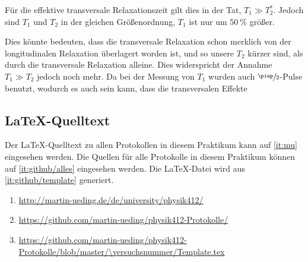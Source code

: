 Für die effektive transversale Relaxationszeit gilt dies in der Tat, $T_1 \gg
T_2^*$. Jedoch sind $T_1$ und $T_2$ in der gleichen Größenordnung, $T_1$ ist
nur um $\SI{50}{\percent}$ größer.

Dies könnte bedeuten, dass die transversale Relaxation schon merklich von der
longitudinalen Relaxation überlagert worden ist, und so unsere $T_2$ kürzer
sind, als durch die transversale Relaxation alleine. Dies widerspricht der
Annahme $T_1 \gg T_2$ jedoch noch mehr. Da bei der Messung von $T_1$ wurden
auch $\sfrac\piup2$-Pulse benutzt, wodurch es auch sein kann, dass die
transversalen Effekte 


\FloatBarrier
\begin{appendix}
    \FloatBarrier
    \chapter{\LaTeX-Quelltext}

    Der \LaTeX-Quelltext zu allen Protokollen in diesem Praktikum kann auf
    \ref{it:mu} eingesehen werden. Die Quellen für alle Protokolle in diesem
    Praktikum können auf \ref{it:github/alles} eingesehen werden. Die
    \LaTeX-Datei wird aus \ref{it:github/template} generiert.

    \begin{enumerate}
        \item
            \label{it:mu}
            \url{http://martin-ueding.de/de/university/physik412/}
        \item
            \label{it:github/alles}
            \url{https://github.com/martin-ueding/physik412-Protokolle/}
        \item
            \label{it:github/template}
            \url{https://github.com/martin-ueding/physik412-Protokolle/blob/master/\versuchsnummer/Template.tex}
    \end{enumerate}
\end{appendix}


\FloatBarrier
\printbibliography



